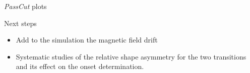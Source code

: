 \documentclass[8pt]{beamer}
\begin{document}
\begin{frame}{ \textit{PassCut} plots}

\begin{figure}
\centering
{}
\end{figure}
\end{frame}


\begin{frame}{Next steps}

\begin{itemize}
\item Add to the simulation the magnetic field drift
\item Systematic studies of the relative shape asymmetry for the two transitions and its effect on the onset determination.
\end{itemize}
\end{frame}
\end{document}
